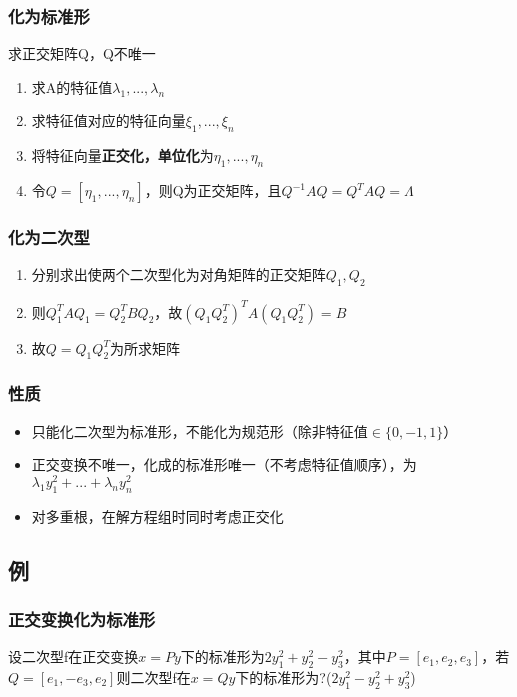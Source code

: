 \subsubsection{化为标准形}
求正交矩阵Q，Q不唯一
\begin{enumerate}
    \item 求A的特征值\(\lambda_1, ..., \lambda_n\)
    \item 求特征值对应的特征向量\(\xi_1, ..., \xi_n\)
    \item 将特征向量\textbf{正交化，单位化}为\(\eta_1, ..., \eta_n\)
    \item 令\(Q = [\eta_1, ..., \eta_n]\)，则Q为正交矩阵，且\(Q^{-1}AQ = Q^TAQ = \Lambda\)
\end{enumerate}

\subsubsection{化为二次型}
\begin{enumerate}
    \item 分别求出使两个二次型化为对角矩阵的正交矩阵\(Q_1, Q_2\)
    \item 则\(Q_1^TAQ_1 = Q_2^TBQ_2\)，故\((Q_1Q_2^T)^TA(Q_1Q_2^T) = B\)
    \item 故\(Q = Q_1Q_2^T\)为所求矩阵
\end{enumerate}


\subsubsection{性质}
\begin{itemize}
    \item 只能化二次型为标准形，不能化为规范形（除非特征值\(\in \{0, -1, 1\}\)）
    \item 正交变换不唯一，化成的标准形唯一（不考虑特征值顺序），为\(\lambda_1y_1^2 + ... + \lambda_ny_n^2\)
    \item 对多重根，在解方程组时同时考虑正交化
\end{itemize}


\subsection{例}

\subsubsection{正交变换化为标准形}
设二次型f在正交变换\(x = Py\)下的标准形为\(2y_1^2 + y_2^2 - y_3^2\)，其中\(P = [e_1, e_2, e_3]\)，若\(Q = [e_1, -e_3, e_2]\)则二次型f在\(x = Qy\)下的标准形为?(\(2y_1^2 - y_2^2 + y_3^2\))

